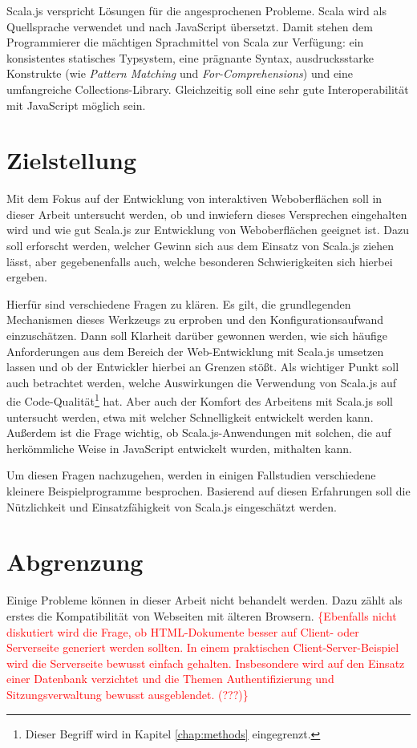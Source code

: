 \documentclass[a4paper, 12pt, hidelinks, listof=totoc, listoftables=totoc, bibliography=totoc]{scrreprt}
\newcommand{\TODOi}[1]{\textcolor{red}{\{#1\}}}
\begin{document}
Scala.js verspricht Lösungen für die angesprochenen Probleme. Scala wird als Quellsprache verwendet und nach JavaScript übersetzt. Damit stehen dem Programmierer die mächtigen Sprachmittel von Scala zur Verfügung: ein konsistentes statisches Typsystem, eine prägnante Syntax, ausdrucksstarke Konstrukte (wie \emph{Pattern Matching} und \emph{For-Comprehensions}) und eine umfangreiche Collections-Library. Gleichzeitig soll eine sehr gute Interoperabilität mit JavaScript möglich sein.


\section{Zielstellung}

Mit dem Fokus auf der Entwicklung von interaktiven Weboberflächen soll in dieser Arbeit untersucht werden, ob und inwiefern dieses Versprechen eingehalten wird und wie gut Scala.js zur Entwicklung von Weboberflächen geeignet ist. Dazu soll erforscht werden, welcher Gewinn sich aus dem Einsatz von Scala.js ziehen lässt, aber gegebenenfalls auch, welche besonderen Schwierigkeiten sich hierbei ergeben.

Hierfür sind verschiedene Fragen zu klären. Es gilt, die grundlegenden Mechanismen dieses Werkzeugs zu erproben und den Konfigurationsaufwand einzuschätzen. Dann soll Klarheit darüber gewonnen werden, wie sich häufige Anforderungen aus dem Bereich der Web-Entwicklung mit Scala.js umsetzen lassen und ob der Entwickler hierbei an Grenzen stößt. Als wichtiger Punkt soll auch betrachtet werden, welche Auswirkungen die Verwendung von Scala.js auf die Code-Qualität\footnote{Dieser Begriff wird in Kapitel \ref{chap:methods} eingegrenzt.} hat. Aber auch der Komfort des Arbeitens mit Scala.js soll untersucht werden, etwa mit welcher Schnelligkeit entwickelt werden kann. Außerdem ist die Frage wichtig, ob Scala.js-Anwendungen mit solchen, die auf herkömmliche Weise in JavaScript entwickelt wurden, mithalten kann.

Um diesen Fragen nachzugehen, werden in einigen Fallstudien verschiedene kleinere Beispielprogramme besprochen. Basierend auf diesen Erfahrungen soll die Nützlichkeit und Einsatzfähigkeit von Scala.js eingeschätzt werden.


\section{Abgrenzung}

Einige Probleme können in dieser Arbeit nicht behandelt werden. Dazu zählt als erstes die Kompatibilität von Webseiten mit älteren Browsern. \TODOi{Ebenfalls nicht diskutiert wird die Frage, ob \ac{HTML}-Dokumente besser auf Client- oder Serverseite generiert werden sollten. In einem praktischen Client-Server-Beispiel wird die Serverseite bewusst einfach gehalten. Insbesondere wird auf den Einsatz einer Datenbank verzichtet und die Themen Authentifizierung und Sitzungsverwaltung bewusst ausgeblendet. (???)}
\end{document}
